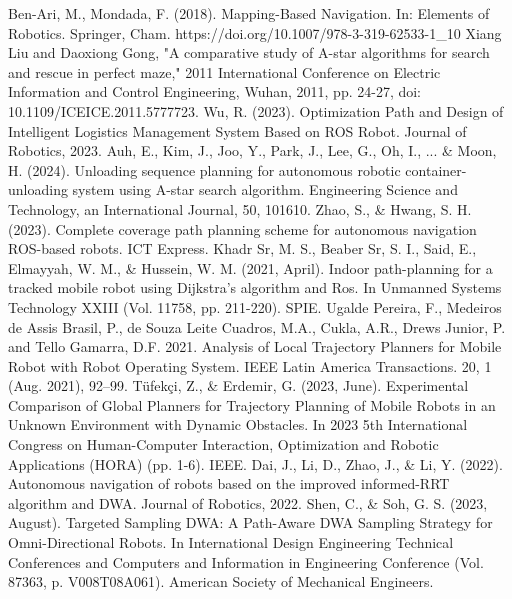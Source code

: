 \documentclass[sigconf]{acmart}
\begin{document}



\begin{thebibliography}{00}

Ben-Ari, M., Mondada, F. (2018). Mapping-Based Navigation. In: Elements of Robotics. Springer, Cham. https://doi.org/10.1007/978-3-319-62533-1\_10
Xiang Liu and Daoxiong Gong, "A comparative study of A-star algorithms for search and rescue in perfect maze," 2011 International Conference on Electric Information and Control Engineering, Wuhan, 2011, pp. 24-27, doi: 10.1109/ICEICE.2011.5777723.
Wu, R. (2023). Optimization Path and Design of Intelligent Logistics Management System Based on ROS Robot. Journal of Robotics, 2023.
Auh, E., Kim, J., Joo, Y., Park, J., Lee, G., Oh, I., ... \& Moon, H. (2024). Unloading sequence planning for autonomous robotic container-unloading system using A-star search algorithm. Engineering Science and Technology, an International Journal, 50, 101610.
Zhao, S., \& Hwang, S. H. (2023). Complete coverage path planning scheme for autonomous navigation ROS-based robots. ICT Express.
Khadr Sr, M. S., Beaber Sr, S. I., Said, E., Elmayyah, W. M., \& Hussein, W. M. (2021, April). Indoor path-planning for a tracked mobile robot using Dijkstra's algorithm and Ros. In Unmanned Systems Technology XXIII (Vol. 11758, pp. 211-220). SPIE.
Ugalde Pereira, F., Medeiros de Assis Brasil, P., de Souza Leite Cuadros, M.A., Cukla, A.R., Drews Junior, P. and Tello Gamarra, D.F. 2021. Analysis of Local Trajectory Planners for Mobile Robot with Robot Operating System. IEEE Latin America Transactions. 20, 1 (Aug. 2021), 92–99.
Tüfekçi, Z., \& Erdemir, G. (2023, June). Experimental Comparison of Global Planners for Trajectory Planning of Mobile Robots in an Unknown Environment with Dynamic Obstacles. In 2023 5th International Congress on Human-Computer Interaction, Optimization and Robotic Applications (HORA) (pp. 1-6). IEEE.
Dai, J., Li, D., Zhao, J., \& Li, Y. (2022). Autonomous navigation of robots based on the improved informed-RRT algorithm and DWA. Journal of Robotics, 2022.
Shen, C., \& Soh, G. S. (2023, August). Targeted Sampling DWA: A Path-Aware DWA Sampling Strategy for Omni-Directional Robots. In International Design Engineering Technical Conferences and Computers and Information in Engineering Conference (Vol. 87363, p. V008T08A061). American Society of Mechanical Engineers.

\end{thebibliography}
\end{document}
